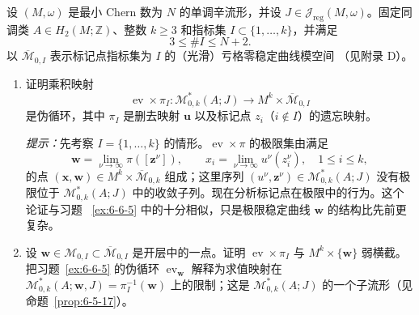 \begin{exercise}\label{ex:6-7-13}
设 $(M,\omega)$ 是最小 Chern 数为 $N$ 的单调辛流形，并设
$J\in\mathcal J_{\mathrm{reg}}(M,\omega)$。固定同调类 $A\in H_2(M;\mathbb Z)$、整数
$k\ge3$ 和指标集 $I\subset\{1,\ldots,k\}$，并满足
\[
  3\le\#I\le N+2.
\]
以 $\overline{\mathcal M}_{0,I}$ 表示标记点指标集为 $I$ 的（光滑）亏格零稳定曲线模空间
（见附录 D）。
\begin{enumerate}[label=\textup{(\roman*)},leftmargin=3em]
\item 证明乘积映射
\[
  \operatorname{ev}\times\pi_I:\mathcal M^*_{0,k}(A;J)
  \longrightarrow M^k\times\overline{\mathcal M}_{0,I}
\]
是伪循环，其中 $\pi_I$ 是删去映射 $\mathbf u$ 以及标记点
$z_i$（$i\notin I$）的遗忘映射。

\emph{提示：}先考察 $I=\{1,\ldots,k\}$ 的情形。$\operatorname{ev}\times\pi$ 的极限集由满足
\[
  \mathbf w=\lim_{\nu\to\infty}\pi([\mathbf z^\nu]),
  \qquad
  x_i=\lim_{\nu\to\infty}u^\nu(z_i^\nu),
  \quad 1\le i\le k,
\]
的点
$(\mathbf x,\mathbf w)\in M^k\times\overline{\mathcal M}_{0,k}$ 组成；这里序列
$(u^\nu,\mathbf z^\nu)\in\mathcal M^*_{0,k}(A;J)$ 没有极限位于
$\mathcal M^*_{0,k}(A;J)$ 中的收敛子列。现在分析标记点在极限中的行为。这个论证与习题
~\ref{ex:6-6-5} 中的十分相似，只是极限稳定曲线 $\mathbf w$ 的结构比先前更复杂。

\item 设
$\mathbf w\in\mathcal M_{0,I}\subset\overline{\mathcal M}_{0,I}$ 是开层中的一点。证明
$\operatorname{ev}\times\pi_I$ 与 $M^k\times\{\mathbf w\}$ 弱横截。把习题~\ref{ex:6-6-5} 的伪循环
$\operatorname{ev}_{\mathbf w}$ 解释为求值映射在
$\mathcal M^*_{0,k}(A;\mathbf w,J)=\pi_I^{-1}(\mathbf w)$ 上的限制；这是
$\mathcal M^*_{0,k}(A;J)$ 的一个子流形（见命题~\ref{prop:6-5-17}）。
\end{enumerate}
\end{exercise}
